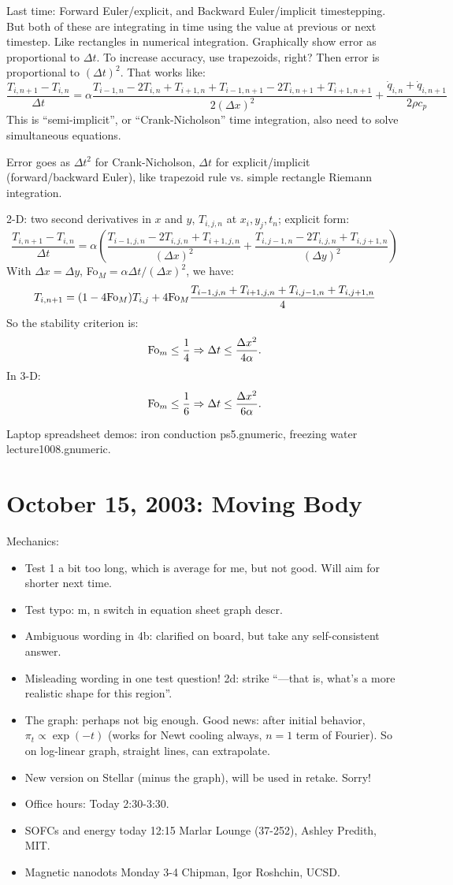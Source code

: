 \documentclass{report}
\begin{document}
Last time: Forward Euler/explicit, and Backward Euler/implicit timestepping.
But both of these are integrating in time using the value at previous or next
timestep.  Like rectangles in numerical integration.  Graphically show error as
proportional to $\Delta t$.  To increase accuracy, use trapezoids, right?  Then
error is proportional to $(\Delta t)^2$.  That works like:
$$\frac{T_{i,n+1} - T_{i,n}}{\Delta t} =
\alpha \frac{T_{i-1,n} - 2T_{i,n} + T_{i+1,n} +
T_{i-1,n+1} - 2T_{i,n+1} + T_{i+1,n+1}}{2(\Delta x)^2} +
\frac{\dot{q}_{i,n} + \dot{q}_{i,n+1}}{2\rho c_p}$$
This is ``semi-implicit'', or ``Crank-Nicholson'' time integration, also need
to solve simultaneous equations.

Error goes as $\Delta t^2$ for Crank-Nicholson, $\Delta t$ for
explicit/implicit (forward/backward Euler), like trapezoid rule vs. simple
rectangle Riemann integration.

2-D: two second derivatives in $x$ and $y$, $T_{i,j,n}$ at $x_i,y_j,t_n$;
explicit form:
$$\frac{T_{i,n+1} - T_{i,n}}{\Delta t} =
\alpha \left(\frac{T_{i-1,j,n} - 2T_{i,j,n} + T_{i+1,j,n}}{(\Delta x)^2} +
\frac{T_{i,j-1,n} - 2T_{i,j,n} + T_{i,j+1,n}}{(\Delta y)^2}\right)$$
With $\Delta x=\Delta y$, Fo$_M=\alpha\Delta t/(\Delta x)^2$, we have:
$$T_{i,n+1} = (1-4{\rm Fo}_M)T_{i,j} +
4{\rm Fo}_M \frac{T_{i-1,j,n} + T_{i+1,j,n} + T_{i,j-1,n} + T_{i,j+1,n}}{4}$$
So the stability criterion is:
$${\rm Fo}_m\leq\frac{1}{4}\Rightarrow\Delta t\leq\frac{\Delta x^2}{4\alpha}.$$
In 3-D:
$${\rm Fo}_m\leq\frac{1}{6}\Rightarrow\Delta t\leq\frac{\Delta x^2}{6\alpha}.$$

Laptop spreadsheet demos: iron conduction ps5.gnumeric, freezing water
lecture1008.gnumeric.
\newpage


\section{October 15, 2003: Moving Body}

Mechanics:
\begin{itemize}
\item Test 1 a bit too long, which is average for me, but not good.  Will aim
  for shorter next time.
\item Test typo: m, n switch in equation sheet graph descr.
\item Ambiguous wording in 4b: clarified on board, but take any self-consistent
  answer.
\item Misleading wording in one test question!  2d: strike ``---that is, what's
  a more realistic shape for this region''.
\item The graph: perhaps not big enough.  Good news: after initial behavior,
  $\pi_t\propto\exp(-t)$ (works for Newt cooling always, $n=1$ term of
  Fourier).  So on log-linear graph, straight lines, can extrapolate.
\item New version on Stellar (minus the graph), will be used in retake.  Sorry!
\item Office hours: Today 2:30-3:30.
\item SOFCs and energy today 12:15 Marlar Lounge (37-252), Ashley Predith, MIT.
\item Magnetic nanodots Monday 3-4 Chipman, Igor Roshchin, UCSD.
\end{itemize}
\end{document}
